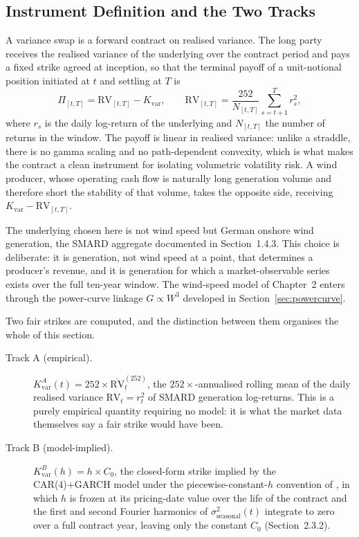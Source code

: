 \documentclass[11pt, a4paper, twoside]{article}
\begin{document}
\subsection{Instrument Definition and the Two Tracks}
\label{sec:varswap-def}

A variance swap is a forward contract on realised variance. The long party receives the realised variance of the underlying over the contract period and pays a fixed strike agreed at inception, so that the terminal payoff of a unit-notional position initiated at $t$ and settling at $T$ is
\begin{equation}
\Pi_{[t,T]} = \mathrm{RV}_{[t,T]} - K_{\text{var}}, \qquad
\mathrm{RV}_{[t,T]} = \frac{252}{N_{[t,T]}}\sum_{s=t+1}^{T} r_s^2,
\label{eq:vs-payoff}
\end{equation}
where $r_s$ is the daily log-return of the underlying and $N_{[t,T]}$ the number of returns in the window. The payoff is linear in realised variance: unlike a straddle, there is no gamma scaling and no path-dependent convexity, which is what makes the contract a clean instrument for isolating volumetric volatility risk. A wind producer, whose operating cash flow is naturally long generation volume and therefore short the stability of that volume, takes the opposite side, receiving $K_{\text{var}} - \mathrm{RV}_{[t,T]}$.

The underlying chosen here is not wind speed but German onshore wind generation, the SMARD aggregate documented in Section~1.4.3. This choice is deliberate: it is generation, not wind speed at a point, that determines a producer's revenue, and it is generation for which a market-observable series exists over the full ten-year window. The wind-speed model of Chapter~2 enters through the power-curve linkage $G \propto W^3$ developed in Section~\ref{sec:powercurve}.

Two fair strikes are computed, and the distinction between them organises the whole of this section.

\begin{description}
\item[Track A (empirical).] $K_{\text{var}}^A(t) = 252 \times \overline{\mathrm{RV}}_t^{(252)}$, the $252\times$-annualised rolling mean of the daily realised variance $\mathrm{RV}_t = r_t^2$ of SMARD generation log-returns. This is a purely empirical quantity requiring no model: it is what the market data themselves say a fair strike would have been.
\item[Track B (model-implied).] $K_{\text{var}}^B(h) = h \times C_0$, the closed-form strike implied by the CAR(4)+GARCH model under the piecewise-constant-$h$ convention of \citet{Tol1997}, in which $h$ is frozen at its pricing-date value over the life of the contract and the first and second Fourier harmonics of $\sigma^2_{\text{seasonal}}(t)$ integrate to zero over a full contract year, leaving only the constant $C_0$ (Section~2.3.2).
\end{description}
\end{document}
